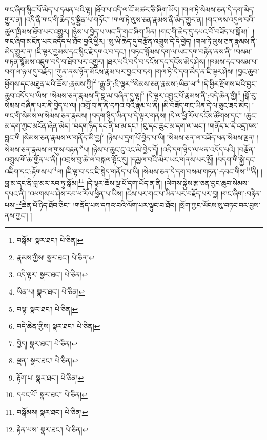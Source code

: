 གང་ཞིག་སྙིང་པོ་མེད་པ་དམན་པའི་ལྷ། །ཐོབ་པ་འདི་ལ་ངོ་མཚར་ཅི་ཞིག་ཡོད། །གལ་ཏེ་སེམས་ཅན་དེ་དག་མེད་གྱུར་ན། །འདི་ནི་གང་གི་ཆེད་དུ་སྦྱིན་པ་གཏོང་། །གལ་ཏེ་ལུས་ཅན་རྣམས་ནི་མེད་གྱུར་ན། །གང་ལས་འདུལ་བའི་ཚུལ་ཁྲིམས་ཐོབ་པར་འགྱུར། །ཉེས་པ་བྱེད་པ་ཡང་ནི་གང་ཞིག་ཡིན། །གང་གི་ཆེད་དུ་དཔའ་བོ་བཟོད་པ་སྒོམ།\footnote{བསྒོམ།  སྣར་ཐང་།  པེ་ཅིན། } །གང་ཞིག་མངོན་པར་འདོད་པ་ཐོབ་བྱའི་ཕྱིར། །སུ་ཡི་ཆེད་དུ་བརྩོན་འགྲུས་དེ་དེ་བྱེད། །གལ་ཏེ་ལུས་ཅན་རྣམས་ནི་མེད་གྱུར་ན། །ཇི་ལྟར་བྱམས་དང་སྙིང་རྗེ་དགའ་བ་དང་། །བཏང་སྙོམས་དག་ལ་ཡང་དག་བརྟེན་ནས་ནི། །བསམ་གཏན་སྙོམས་འཇུག་བདེ་བ་ཐོབ་པར་འགྱུར། །ཐར་པའི་བདེ་བ་དངོས་དང་དངོས་མེད་ཤེས། །ཁམས་དང་བསམ་པ་བག་ལ་ཉལ་དུ་བརྗོད། །ཀུན་ནས་ཉོན་མོངས་རྣམ་པར་བྱང་བ་དག །གལ་ཏེ་དེ་དག་མེད་ན་ཇི་ལྟར་ཤེས། །བྱང་ཆུབ་ཕྱོགས་དང་མཐུན་པའི་ཆོས་:རྣམས་ཀྱི།\footnote{རྣམས་ཀྱིས།  སྣར་ཐང་།  པེ་ཅིན། } །རྒྱུ་ནི་:ཇི་ལྟར་\footnote{འདི་ལྟར་  སྣར་ཐང་།  པེ་ཅིན། }སེམས་ཅན་རྣམས་:ཡིན་ལ།\footnote{ཡིན་པ།  སྣར་ཐང་།  པེ་ཅིན། } །དེ་ཕྱིར་རྫོགས་པའི་བྱང་ཆུབ་འདོད་པ་ཡིས། །སེམས་ཅན་རྣམས་ནི་བླ་མ་བཞིན་དུ་ལྟ།\footnote{བལྟ།  སྣར་ཐང་།  པེ་ཅིན། } །དེ་ལྟར་འབྱུང་པོ་རྣམས་ནི་:བདེ་ཆེན་གྱི།\footnote{བདེ་ཆེན་གྱིས།  སྣར་ཐང་།  པེ་ཅིན། } །སྒོ་རུ་སེམས་བཞིན་པར་ནི་བྱེད་པ་ལ། །འགྲོ་བ་ན་ནི་དཀའ་བའི་རྣམ་པ་ནི། །མི་བཟོད་གང་ཡིན་དེ་ལ་ཅུང་ཟད་མེད། །གང་གི་སེམས་ལ་སེམས་ཅན་རྣམས། །བདག་ཉིད་ཡིན་པ་དེ་ལྟར་གནས། །དེ་ལ་ཕྱི་རོལ་དངོས་ཚོགས་དང་། །ཆུང་མ་དག་ཀྱང་མངོན་ཞེན་མེད། །བདག་ཉིད་དང་ནི་ཕ་མ་དང་། །བུ་དང་ཆུང་མ་དག་ལ་ཡང་། །གནོད་པ་དེ་འདྲ་ཁས་བླང་གི །སེམས་ཅན་རྣམས་ལ་གནོད་མི་བྱ།\footnote{བྱེད།  སྣར་ཐང་།  པེ་ཅིན། } །ཉེས་པ་དྲག་པོ་བྱེད་པ་ཡི། །སེམས་ཅན་ལ་བཟོད་ཕན་སེམས་ལྡན། །སེམས་ཅན་རྣམས་ལ་གུས་བརྟན་\footnote{ལྡན་  སྣར་ཐང་།  པེ་ཅིན། }པ། །ཉེས་པ་ཆུང་ངུ་འང་མི་བྱེད་དོ། །འདི་དག་ཉིད་ལ་ཕན་འདོད་པའི། །བརྩོན་འགྲུས་གོ་ཆ་གྱོན་པ་ནི། །འབྲས་བུ་ཆེ་ལ་བསྐལ་སྟོང་དུ། །དམྱལ་བའི་མེར་ཡང་གནས་པར་སྤྲོ། །བདག་གི་སྐྱེ་དང་འཇིག་དང་:རྟོགས་པ་\footnote{རྟོག་པ་  སྣར་ཐང་།  པེ་ཅིན། }ལ། །ཇི་ལྟ་བ་དང་ཇི་སྙེད་གནོད་པ་ཡི། །སེམས་ཅན་དེ་དག་བསམ་གཏན་:དབང་གིས་\footnote{དབང་པོ་  སྣར་ཐང་།  པེ་ཅིན། }ནི། །བླ་མ་དང་ནི་བླ་མར་རབ་ཏུ་སྒོམ།\footnote{བསྒོམས།  སྣར་ཐང་།  པེ་ཅིན། } །དེ་ལྟར་ཆོས་ལྔ་པོ་དག་ཡོད་ན་ནི། །ལེགས་སྐྱེས་རྩ་ཅན་བྱང་ཆུབ་སེམས་དཔའ་ནི། །འཕགས་པ་ཤེས་རབ་ཕ་རོལ་ཕྱིན་པ་ཡིས། །ངེས་པར་གང་པ་ཡིན་པར་བརྗོད་པར་བྱ། །གང་ཞིག་:བརྟེན་པས་\footnote{རྟེན་པས་  སྣར་ཐང་།  པེ་ཅིན། }ཆེན་པོ་ཉིད་ཐོབ་ཅིང་། །གནོད་པས་དཀའ་བའི་ལོག་པར་ལྟུང་བ་ཐོབ། །སྲོག་ཀྱང་ཡོངས་སུ་བཏང་བར་བྱས་ནས་ཀྱང་། །
